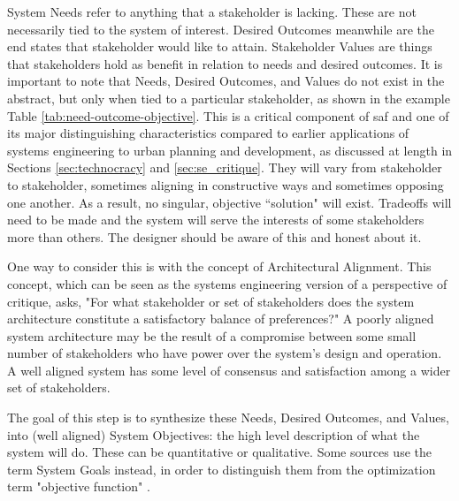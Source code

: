 System Needs refer to anything that a stakeholder is lacking. These are not necessarily tied to the system of interest. Desired Outcomes meanwhile are the end states that stakeholder would like to attain. Stakeholder Values are things that stakeholders hold as benefit in relation to needs and desired outcomes. It is important to note that Needs, Desired Outcomes, and Values do not exist in the abstract, but only when tied to a particular stakeholder, as shown in the example Table \ref{tab:need-outcome-objective}. This is a critical component of \ac{saf} and one of its major distinguishing characteristics compared to earlier applications of systems engineering to urban planning and development, as discussed at length in Sections \ref{sec:technocracy} and \ref{sec:se_critique}. They will vary from stakeholder to stakeholder, sometimes aligning in constructive ways and sometimes opposing one another. As a result, no singular, objective ``solution" will exist. Tradeoffs will need to be made and the system will serve the interests of some stakeholders more than others. The designer should be aware of this and honest about it.

One way to consider this is with the concept of Architectural Alignment. This concept, which can be seen as the systems engineering version of a perspective of critique, asks, "For what stakeholder or set of stakeholders does the system architecture constitute a satisfactory balance of preferences?" A poorly aligned system architecture may be the result of a compromise between some small number of stakeholders who have power over the system's design and operation. A well aligned system has some level of consensus and satisfaction among a wider set of stakeholders.

The goal of this step is to synthesize these Needs, Desired Outcomes, and Values, into (well aligned) System Objectives: the high level description of what the system will do. These can be quantitative or qualitative. Some sources use the term System Goals instead, in order to distinguish them from the optimization term "objective function" \cite{nasaofficeofthechiefengineerNASASystemsEngineering2004}.

